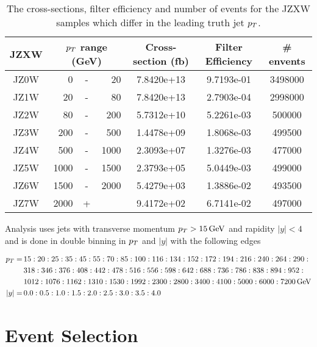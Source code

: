 \begin{table}
  \centering
  \begin{tabular}{|c|rcr|c|c|c|}
    \hline 
     JZXW & \multicolumn{3}{|c|}{$p_{T}$ range (GeV)} & Cross-section (fb) & Filter Efficiency & \# envents  \\ 
    \hline
    \hline
		 JZ0W &     0 & - &    20 & 7.8420e+13 & 9.7193e-01 & 3498000 \\ 
    \hline
		 JZ1W &    20 & - &    80 & 7.8420e+13 & 2.7903e-04 & 2998000 \\
    \hline
		 JZ2W &    80 & - &   200 & 5.7312e+10 & 5.2261e-03 & 500000  \\
    \hline
		 JZ3W &   200 & - &   500 & 1.4478e+09 & 1.8068e-03 & 499500  \\
    \hline
		 JZ4W &   500 & - &  1000 & 2.3093e+07 & 1.3276e-03 & 477000  \\
    \hline
		 JZ5W &  1000 & - &  1500 & 2.3793e+05 & 5.0449e-03 & 499000  \\
    \hline
		 JZ6W &  1500 & - &  2000 & 5.4279e+03 & 1.3886e-02 & 493500  \\
    \hline
		 JZ7W &  2000 & + &       & 9.4172e+02 & 6.7141e-02 & 497000  \\
    \hline 
  \end{tabular}
  \caption{The cross-sections, filter efficiency and number of events for the JZXW samples which differ in the leading truth jet $p_{T}$.}
  \label{tab:JZXW}
\end{table}

Analysis uses jets with transverse momentum $p_{T} > 15\,\text{GeV}$ and rapidity $|y| <
4$ and is done in double binning in $p_{T}$ and $|y|$ with the following edges

\small
\begin{align}
  p_{T} = \, &15:20:25:35:45:55:70:85:100:116:134:152:172:194:216:240:264:290: \nonumber \\
        &318:346:376:408:442:478:516:556:598:642:688:736:786:838:894:952: \nonumber \\
        &1012:1076:1162:1310:1530:1992:2300:2800:3400:4100:5000:6000:7200 \,\text{GeV} \nonumber \\
  |y| = \, &0.0:0.5:1.0:1.5:2.0:2.5:3.0:3.5:4.0
  \label{eq:Binning}
\end{align}
\normalsize

\section{Event Selection}

